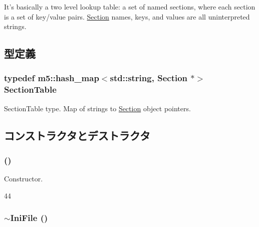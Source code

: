 It's basically a two level lookup table: a set of named sections, where each section is a set of key/value pairs. \hyperlink{classIniFile_1_1Section}{Section} names, keys, and values are all uninterpreted strings. 

\subsection{型定義}
\hypertarget{classIniFile_a7f866c6d9bf26c09923718bbfb02353d}{
\subsubsection[{SectionTable}]{\setlength{\rightskip}{0pt plus 5cm}typedef m5::hash\_\-map$<$std::string, {\bf Section} $\ast$$>$ {\bf SectionTable}}}
\label{classIniFile_a7f866c6d9bf26c09923718bbfb02353d}


SectionTable type. Map of strings to \hyperlink{classIniFile_1_1Section}{Section} object pointers. 

\subsection{コンストラクタとデストラクタ}
\hypertarget{classIniFile_aea7ed2d74f0ddb1182cea26dff360606}{
\subsubsection[{IniFile}]{ ()}}
\label{classIniFile_aea7ed2d74f0ddb1182cea26dff360606}


Constructor. 


\begin{DoxyCode}
44 {}
\end{DoxyCode}
\hypertarget{classIniFile_ae0e356ba5d5901a4fbc0e1e7d1737590}{
\subsubsection[{$\sim$IniFile}]{\setlength{\rightskip}{0pt plus 5cm}$\sim${\bf IniFile} ()}}
\label{classIniFile_ae0e356ba5d5901a4fbc0e1e7d1737590}


